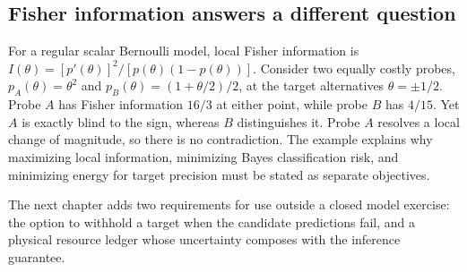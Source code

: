 \subsection{Fisher information answers a different question}

For a regular scalar Bernoulli model, local Fisher information is
$I(\theta)=[p'(\theta)]^2/[p(\theta)(1-p(\theta))]$. Consider two equally costly
probes, $p_A(\theta)=\theta^2$ and $p_B(\theta)=(1+\theta/2)/2$, at the target
alternatives $\theta=\pm1/2$. Probe $A$ has Fisher information $16/3$ at either
point, while probe $B$ has $4/15$. Yet $A$ is exactly blind to the sign, whereas
$B$ distinguishes it. Probe $A$ resolves a local change of magnitude, so there
is no contradiction. The example explains why maximizing local information,
minimizing Bayes classification risk, and minimizing energy for target precision
must be stated as separate objectives.

The next chapter adds two requirements for use outside a closed model exercise:
the option to withhold a target when the candidate predictions fail, and a
physical resource ledger whose uncertainty composes with the inference guarantee.
